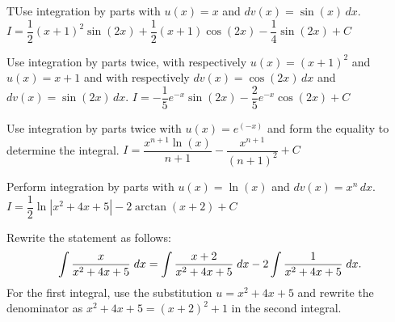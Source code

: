 \begin{Answer}
     TUse integration by parts with $u(x)=x$ and $dv(x) = \sin(x)\,dx$.
    \Question $I = \dfrac{1}{2}(x+1)^2\sin(2x) + \dfrac{1}{2}(x+1)\cos(2x) - \dfrac{1}{4}\sin(2x) + C$
    
     Use integration by parts twice, with respectively $u(x)=(x+1)^2$ and $u(x)=x+1$ and with respectively $dv(x)=\cos(2x)\,dx$ and $dv(x)=\sin(2x)\,dx$. 
    \Question $I = -\dfrac{1}{5}e^{-x}\sin(2x) -\dfrac{2}{5}e^{-x}\cos(2x) + C$
    
    Use integration by parts twice with $u(x)=e^(-x)$ and form the equality to determine the integral.
    \Question $I=\dfrac{x^{n+1}\ln(x)}{n+1} - \dfrac{x^{n+1}}{(n+1)^2} + C$
    
     Perform integration by parts with $u(x)=\ln(x)$ and $dv(x)=x^n\,dx$.
    \Question $I = \dfrac{1}{2}\ln\left|x^2+4x+5\right| - 2\arctan(x+2) + C$
   
    Rewrite the statement as follows:
    \[ \displaystyle \int \dfrac{x}{x^2+4x+5}\; dx = \displaystyle \int \dfrac{x+2}{x^2+4x+5}\; dx - 2 \displaystyle \int \dfrac{1}{x^2+4x+5}\; dx.\]
    For the first integral, use the substitution $u=x^2+4x+5$ and rewrite the denominator as $x^2+4x+5=(x+2)^2+1$ in the second integral.

\end{Answer}
\fi	


